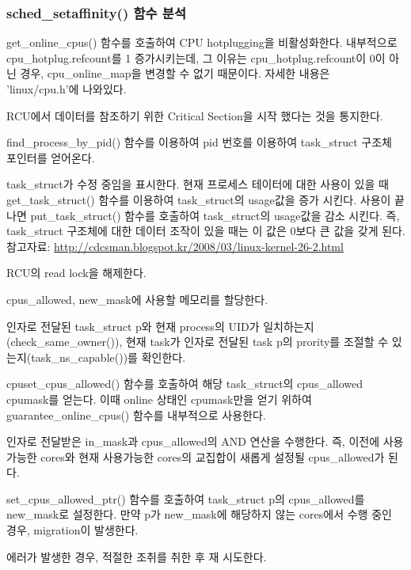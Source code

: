 \subsubsection{sched\_setaffinity() 함수 분석}



\begin{compactenum}
\item get\_online\_cpus() 함수를 호출하여 CPU hotplugging을 비활성화한다.  
내부적으로 cpu\_hotplug.refcount를 1 증가시키는데, 그 이유는 cpu\_hotplug.refcount이 0이 아닌 경우, cpu\_online\_map을 변경할 수 없기 때문이다. 
자세한 내용은 'linux/cpu.h'에 나와있다. 
\item RCU에서 데이터를 참조하기 위한 Critical Section을 시작 했다는 것을 통지한다. 
\item find\_process\_by\_pid() 함수를 이용하여 pid 번호를 이용하여 task\_struct 구조체 포인터를 얻어온다. 
\item task\_struct가 수정 중임을 표시한다. 
현재 프로세스 테이터에 대한 사용이 있을 때 get\_task\_struct() 함수를 이용하여 task\_struct의 usage값을 증가 시킨다. 
사용이 끝나면 put\_task\_struct() 함수를 호출하여 task\_struct의 usage값을 감소 시킨다. 
즉, task\_struct 구조체에 대한 데이터 조작이 있을 때는 이 값은 0보다 큰 값을 갖게 된다. \\
참고자료: \url{http://cdcsman.blogspot.kr/2008/03/linux-kernel-26-2.html}
\item RCU의 read lock을 해제한다. 
\item cpus\_allowed, new\_mask에 사용할 메모리를 할당한다.
\item 인자로 전달된 task\_struct p와 현재 process의 UID가 일치하는지(check\_same\_owner()), 
현재 task가 인자로 전달된 task p의 prority를 조절할 수 있는지(task\_ns\_capable())를 확인한다. 
\item cpuset\_cpus\_allowed() 함수를 호출하여 해당 task\_struct의 cpus\_allowed cpumask를 얻는다. 
이때 online 상태인 cpumask만을 얻기 위하여 guarantee\_online\_cpus() 함수를 내부적으로 사용한다.
\item 인자로 전달받은 in\_mask과 cpus\_allowed의 AND 연산을 수행한다. 
즉, 이전에 사용가능한 cores와 현재 사용가능한 cores의 교집합이 새롭게 설정될 cpus\_allowed가 된다. 
\item set\_cpus\_allowed\_ptr() 함수를 호출하여 task\_struct p의 cpus\_allowed를 new\_mask로 설정한다. 
만약 p가 new\_mask에 해당하지 않는 cores에서 수행 중인 경우, migration이 발생한다. 
\item 에러가 발생한 경우, 적절한 조취를 취한 후 재 시도한다. 
\end{compactenum}

